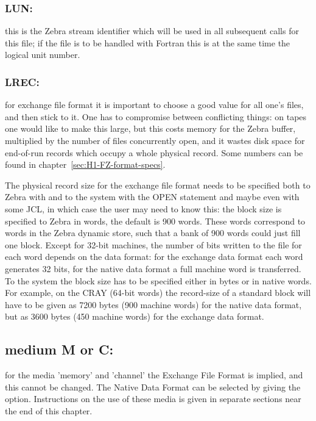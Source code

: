 \subsubsection*{LUN:}

this is the Zebra stream identifier which will be used in all subsequent
calls for this file; if the file is to be handled with Fortran this
is at the same time the logical unit number.

\subsubsection*{LREC:}

for exchange file format it is important to choose a good value for
all one's files, and then stick to it.
One has to compromise between conflicting things:
on tapes one would like to make this large,
but this costs memory for the Zebra buffer,
multiplied by the number of files concurrently open,
and it wastes disk space for end-of-run records which occupy
a whole physical record.
Some numbers can be found in chapter~\ref{sec:H1-FZ-format-specs}.

The physical record size for the exchange file format needs to be
specified both to Zebra with  and to the system with the OPEN
statement and maybe even with some JCL,
in which case the user may need to know this:
the block size is specified to Zebra in words, the default is 900 words.
These words correspond to words in the Zebra dynamic store,
such that a bank of 900 words could just fill one block.
Except for 32-bit machines,
the number of bits written to the file for each word depends
on the data format: for the exchange data format each word
generates 32 bits, for the native data format a full machine word
is transferred.
To the system the block size has to be specified either in bytes
or in native words.
For example, on the CRAY (64-bit words) the record-size of
a standard block will have to be given as 7200 bytes
(900 machine words) for the native data format,
but as 3600 bytes (450 machine words) for the exchange data format.

\subsection*{medium M or C:}

for the media 'memory' and 'channel' the Exchange File Format
is implied, and this cannot be changed.
The Native Data Format can be selected by giving the  option.
Instructions on the use of these media is given in separate
sections near the end of this chapter.

